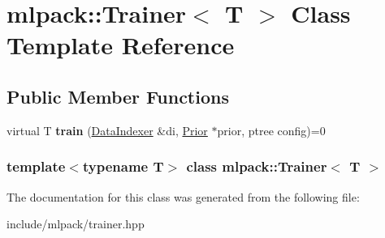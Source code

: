 \hypertarget{classmlpack_1_1_trainer}{
\section{mlpack::Trainer$<$ T $>$ Class Template Reference}
\label{classmlpack_1_1_trainer}
}
\subsection*{Public Member Functions}
\begin{DoxyCompactItemize}
\item 
\hypertarget{classmlpack_1_1_trainer_a30d68e9ccf847d21b03c00e0be79cc55}{
virtual T {\bfseries train} (\hyperlink{classmlpack_1_1_data_indexer}{DataIndexer} \&di, \hyperlink{classmlpack_1_1_prior}{Prior} $\ast$prior, ptree config)=0}
\label{classmlpack_1_1_trainer_a30d68e9ccf847d21b03c00e0be79cc55}

\end{DoxyCompactItemize}
\subsubsection*{template$<$typename T$>$ class mlpack::Trainer$<$ T $>$}



The documentation for this class was generated from the following file:\begin{DoxyCompactItemize}
\item 
include/mlpack/trainer.hpp\end{DoxyCompactItemize}
